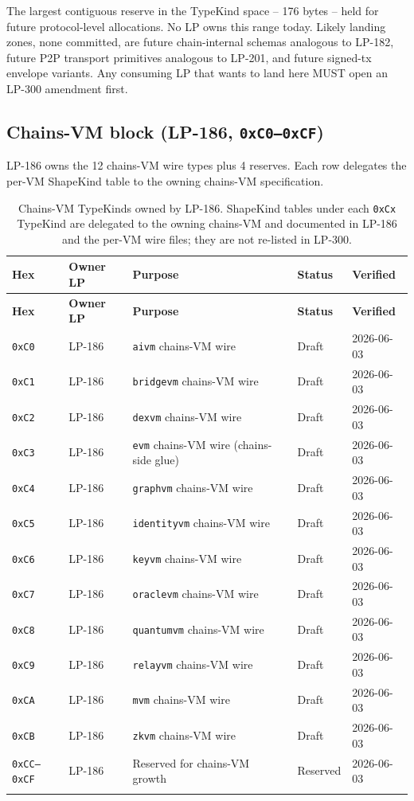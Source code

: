 The largest contiguous reserve in the TypeKind space -- 176 bytes --
held for future protocol-level allocations. No LP owns this range
today. Likely landing zones, none committed, are future chain-internal
schemas analogous to LP-182, future P2P transport primitives analogous
to LP-201, and future signed-tx envelope variants. Any consuming LP
that wants to land here MUST open an LP-300 amendment first.

\subsection{Chains-VM block (LP-186, \texttt{0xC0--0xCF})}

LP-186 owns the 12 chains-VM wire types plus 4 reserves. Each row
delegates the per-VM ShapeKind table to the owning chains-VM
specification.

\begin{longtable}{@{}p{1.9cm}p{1.4cm}p{6.7cm}p{1.4cm}p{1.6cm}@{}}
\toprule
\textbf{Hex} & \textbf{Owner LP} & \textbf{Purpose} & \textbf{Status} & \textbf{Verified} \\
\midrule
\endfirsthead
\toprule
\textbf{Hex} & \textbf{Owner LP} & \textbf{Purpose} & \textbf{Status} & \textbf{Verified} \\
\midrule
\endhead
\texttt{0xC0} & LP-186 & \texttt{aivm} chains-VM wire & Draft & 2026-06-03 \\
\texttt{0xC1} & LP-186 & \texttt{bridgevm} chains-VM wire & Draft & 2026-06-03 \\
\texttt{0xC2} & LP-186 & \texttt{dexvm} chains-VM wire & Draft & 2026-06-03 \\
\texttt{0xC3} & LP-186 & \texttt{evm} chains-VM wire (chains-side glue) & Draft & 2026-06-03 \\
\texttt{0xC4} & LP-186 & \texttt{graphvm} chains-VM wire & Draft & 2026-06-03 \\
\texttt{0xC5} & LP-186 & \texttt{identityvm} chains-VM wire & Draft & 2026-06-03 \\
\texttt{0xC6} & LP-186 & \texttt{keyvm} chains-VM wire & Draft & 2026-06-03 \\
\texttt{0xC7} & LP-186 & \texttt{oraclevm} chains-VM wire & Draft & 2026-06-03 \\
\texttt{0xC8} & LP-186 & \texttt{quantumvm} chains-VM wire & Draft & 2026-06-03 \\
\texttt{0xC9} & LP-186 & \texttt{relayvm} chains-VM wire & Draft & 2026-06-03 \\
\texttt{0xCA} & LP-186 & \texttt{mvm} chains-VM wire & Draft & 2026-06-03 \\
\texttt{0xCB} & LP-186 & \texttt{zkvm} chains-VM wire & Draft & 2026-06-03 \\
\texttt{0xCC--0xCF} & LP-186 & Reserved for chains-VM growth & Reserved & 2026-06-03 \\
\bottomrule
\caption{Chains-VM TypeKinds owned by LP-186. ShapeKind tables under
each \texttt{0xCx} TypeKind are delegated to the owning chains-VM and
documented in LP-186 and the per-VM wire files; they are not
re-listed in LP-300.}
\label{tab:typekind-lp186}
\end{longtable}

